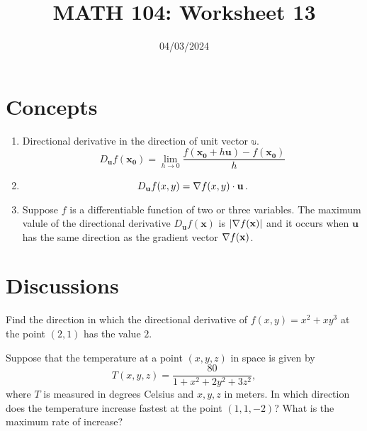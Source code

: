 \documentclass[12pt]{amsart}
\title{ MATH 104: Worksheet 13}
\author{}
\date{04/03/2024}
\begin{document}
\maketitle


\section{Concepts}

\begin{enumerate}
	\item Directional derivative in the direction of unit vector $\mathbb{u}$.
	      \begin{equation*}
		      D_{\mathbf{u}} f(\mathbf{x_0})
		      =
		      \lim_{h\to 0}
		      \frac{ f(\mathbf{x_0} + h \mathbf{u}) - f(\mathbf{x_0})}{h}
	      \end{equation*}
	\item
	      \begin{theorem}
		      \begin{equation*}
			      D_{\mathbf{u}} f(x,y) = \nabla f(x,y) \cdot \mathbf{u} \,.
		      \end{equation*}
	      \end{theorem}

	\item
	      \begin{theorem}
		      Suppose $f$ is a differentiable function of two or three variables.
		      The maximum valule of the directional derivative $D_{\mathbf{u}} f(\mathbf{x})$ is $|\nabla f(\mathbf{x})|$
		      and it occurs when $\mathbf{u}$ has the same direction as the gradient vector $\nabla f(\mathbf{x})$.
	      \end{theorem}

\end{enumerate}

\newpage
\section{Discussions}

\begin{question}
	Find the direction in which the directional derivative of $f(x,y) = x^2 + xy^3$ at the point $(2,1)$ has the value $2$.
\end{question}

\vspace{7cm}
\begin{question}
	Suppose that the temperature at a point $(x, y, z)$ in space is given by
	\[
		T(x, y, z) = \frac{80}{1 + x^2 + 2y^2 + 3z^2},
	\]
	where $T$ is measured in degrees Celsius and $x, y, z$ in meters. In which direction does the temperature increase fastest at the point $(1, 1, -2)$? What is the maximum rate of increase?
\end{question}
\end{document}
